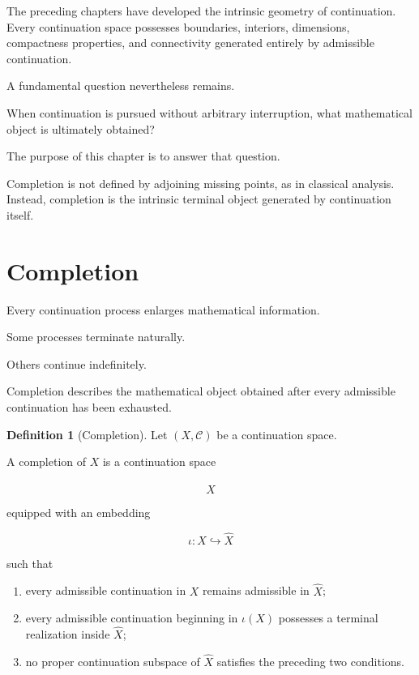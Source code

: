 \documentclass[13pt,openany]{book}
\theoremstyle{plain}
\theoremstyle{definition}
\newtheorem{definition}{Definition}[chapter]
\begin{document}
The preceding chapters have developed the intrinsic geometry of continuation.
Every continuation space possesses boundaries, interiors, dimensions,
compactness properties, and connectivity generated entirely by admissible
continuation.

A fundamental question nevertheless remains.

When continuation is pursued without arbitrary interruption, what mathematical
object is ultimately obtained?

The purpose of this chapter is to answer that question.

Completion is not defined by adjoining missing points, as in classical
analysis. Instead, completion is the intrinsic terminal object generated by
continuation itself.

\section{Completion}

Every continuation process enlarges mathematical information.

Some processes terminate naturally.

Others continue indefinitely.

Completion describes the mathematical object obtained after every admissible
continuation has been exhausted.

\begin{definition}[Completion]
Let $(X,\mathcal C)$ be a continuation space.

A completion of $X$ is a continuation space

\[
\widehat X
\]

equipped with an embedding

\[
\iota:X\hookrightarrow\widehat X
\]

such that

\begin{enumerate}
\item every admissible continuation in $X$ remains admissible in
$\widehat X$;

\item every admissible continuation beginning in $\iota(X)$ possesses a
terminal realization inside $\widehat X$;

\item no proper continuation subspace of $\widehat X$ satisfies the preceding
two conditions.
\end{enumerate}

\end{definition}
\end{document}
